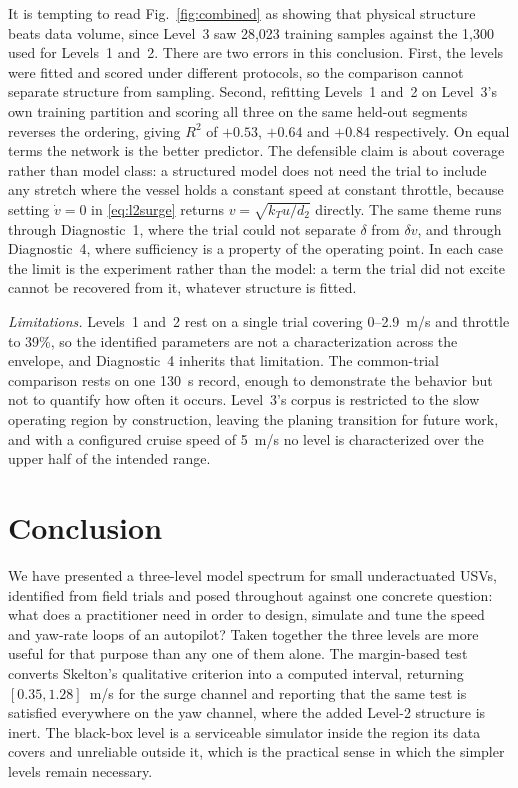 \documentclass[conference]{IEEEtran}
\begin{document}
It is tempting to read Fig.~\ref{fig:combined} as showing that physical structure beats data volume, since Level~3 saw 28{,}023 training samples against the 1{,}300 used for Levels~1 and~2. There are two errors in this conclusion. First, the levels were fitted and scored under different protocols, so the comparison cannot separate structure from sampling.  Second, refitting Levels~1 and~2 on Level~3's own training partition and scoring all three on the same held-out segments reverses the ordering, giving $R^2$ of $+0.53$, $+0.64$ and $+0.84$ respectively. On equal terms the network is the better predictor. The defensible claim is about coverage rather than model class: a structured model does not need the trial to include any stretch where the vessel holds a constant speed at constant throttle, because setting $\dot v=0$ in \eqref{eq:l2surge} returns $v=\sqrt{k_T u/d_2}$ directly. The same theme runs through Diagnostic~1, where the trial could not separate $\delta$ from $\delta v$, and through Diagnostic~4, where sufficiency is a property of the operating point. 
In each case the limit is the experiment rather than the model: a term the trial did not excite cannot be recovered from it, whatever structure is fitted.

\emph{Limitations.} Levels~1 and~2 rest on a single trial covering 0--2.9~m/s and throttle to 39\%, so the identified parameters are not a characterization across the envelope, and Diagnostic~4 inherits that limitation. The common-trial comparison rests on one 130~s record, enough to demonstrate the behavior but not to quantify how often it occurs. Level~3's corpus is restricted to the slow operating region by construction, leaving the planing transition for future work, and with a configured cruise speed of 5~m/s no level is characterized over the upper half of the intended range.

\section{Conclusion}
\label{sec:conclusion}

We have presented a three-level model spectrum for small underactuated USVs, identified from field trials and posed throughout against one concrete question: what does a practitioner need in order to design, simulate and tune the speed and yaw-rate loops of an autopilot? Taken together the three levels are more useful for that purpose than any one of them alone. The margin-based test converts Skelton's qualitative criterion into a computed interval, returning $[0.35, 1.28]$~m/s for the surge channel and reporting that the same test is satisfied everywhere on the yaw channel, where the added Level-2 structure is inert. The black-box level is a serviceable simulator inside the region its data covers and unreliable outside it, which is the practical sense in which the simpler levels remain necessary.
\end{document}
